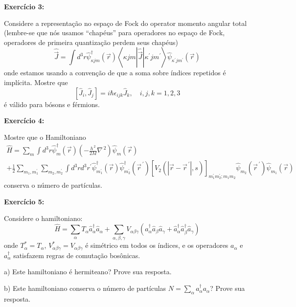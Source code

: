 \documentclass[12pt]{article}
\begin{document}
\textbf{Exercício 3:} 

Considere a representação no espaço de Fock do operator momento angular total
(lembre-se que nós usamos ``chapéus'' para operadores no espaço de Fock, operadores de primeira quantização perdem seus chapéus)
\[
\hat{\vec{J}}=\int d^{3} r \hat{\psi}_{\kappa j m}^{\dagger}(\vec{r})\left\langle\kappa j m|\hat{\vec{J}}| \kappa^{\prime} j m^{\prime}\right\rangle \hat{\psi}_{\kappa^{\prime} j m^{\prime}}(\vec{r})
\]
onde estamos usando a convenção de que a soma sobre índices repetidos é implícita. Mostre que
\[
\left[\hat{J}_{i}, \hat{J}_{j}\right]=i \hbar \epsilon_{i j k} \hat{J}_{k}, \quad i, j, k=1,2,3
\]
é válido para bósons e férmions.

\textbf{Exercício 4:}

Mostre que o Hamiltoniano
\begin{gather}
\hat{H}=\sum_{m} \int d^{3} r \hat{\psi}_{m}^{\dagger}(\vec{r})\left(-\frac{h^{\,2}}{2 M} \nabla^{\,2}\right) \hat{\psi}_{m}(\vec{r})\\
+\frac{1}{2} \sum_{m_{1}, m_{1}^{\prime}} \sum_{m_{2}, m_{2}^{\prime}} \int d^{3} r d^{3} r^{\prime} \hat{\psi}_{m_{1}^{\prime}}^{\dagger}(\vec{r}) \hat{\psi}_{m_{2}^{\prime}}^{\dagger}\left(\vec{r}^{\,\prime}\right)\left[V_{2}\left(\left|\vec{r}-\vec{r}^{\,\prime}\right|, s\right)\right]_{m_{1}^{\prime} m_{2}^{\prime} ; m_{1} m_{2}} \hat{\psi}_{m_{2}}\left(\vec{r}^{\,\prime}\right) \hat{\psi}_{m_{1}}(\vec{r})
\end{gather}
conserva o número de partículas.

\textbf{Exercício 5:}

Considere o hamiltoniano:
%
\[
\hat{H} = \sum _ { \alpha } T _ { \alpha } \hat{a} _ { \alpha } ^ { \dagger } \hat{a} _ { \alpha } + \sum _ { \alpha , \beta , \gamma } V _ { \alpha \beta \gamma } \left( \hat{a} _ { \alpha } ^ { \dagger } \hat{a} _ { \beta } \hat{a} _ { \gamma } + \hat{a} _ { \alpha } ^ { \dagger } \hat{a} _ { \beta } ^ { \dagger } \hat{a} _ { \gamma } \right)
\]
onde $T^*_\alpha = T_\alpha$, $V^*_{\alpha\beta\gamma} = V_{\alpha\beta\gamma}$ é simétrico em todos os índices, e os operadores $a_\alpha$ e $a_\alpha^\dagger$ satisfazem regras de comutação bosônicas.

a) Este hamiltoniano é hermiteano? Prove sua resposta.

b) Este hamiltoniano conserva o número de partículas $N = \sum_\alpha a_\alpha^\dagger  a_\alpha$?
Prove sua resposta.
\end{document}
